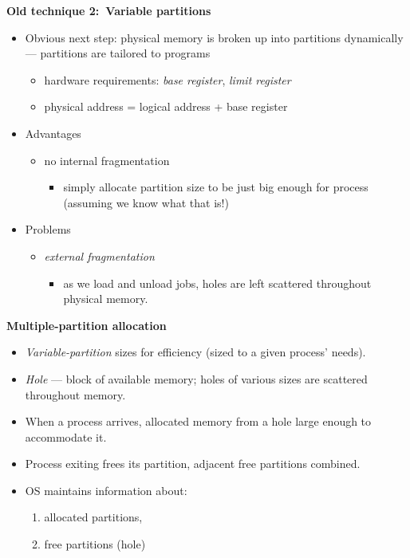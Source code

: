 \documentclass[11pt,a4paper]{article}
\begin{document}
\textbf{Old technique 2:\ Variable partitions}
\begin{itemize}
    \item Obvious next step: physical memory is broken up into partitions dynamically ---
        partitions are tailored to programs
        \begin{itemize}
            \item hardware requirements: \emph{base register}, \emph{limit register}
            \item physical address = logical address + base register
        \end{itemize}
    \item Advantages
        \begin{itemize}
            \item no internal fragmentation
                \begin{itemize}
                    \item simply allocate partition size to be just big enough for process
                        (assuming we know what that is!)
                \end{itemize}
        \end{itemize}
    \item Problems
        \begin{itemize}
            \item \emph{external fragmentation}
                \begin{itemize}
                    \item as we load and unload jobs, holes are left scattered throughout
                        physical memory.
                \end{itemize}
        \end{itemize}
\end{itemize}

\textbf{Multiple-partition allocation}
\begin{itemize}
    \item \emph{Variable-partition} sizes for efficiency (sized to a given process' needs).
    \item \emph{Hole} --- block of available memory; holes of various sizes are scattered
        throughout memory.
    \item When a process arrives, allocated memory from a hole large enough to accommodate
        it.
    \item Process exiting frees its partition, adjacent free partitions combined.
    \item OS maintains information about:
        \begin{enumerate}
            \item allocated partitions,
            \item free partitions (hole)
        \end{enumerate}
\end{itemize}
\end{document}
